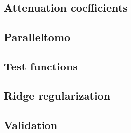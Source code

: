 \documentclass{article}
\begin{document}
\subsection{Attenuation coefficients}\label{appendix:attenuation-coefficients}


\subsection{Paralleltomo}\label{appendix:paralleltomo}


\subsection{Test functions}\label{appendix:generate-test-functions}


\subsection{Ridge regularization}\label{appendix:ridge-regularization}


\subsection{Validation}\label{appendix:validation}

\end{document}
